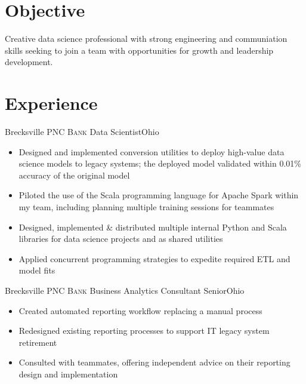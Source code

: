 \documentclass[letterpaper,12pt,color,final]{moderncv}
\begin{document}
\makecvtitle

\section{Objective}




Creative data science professional with strong engineering and communiation skills seeking to join a team with opportunities for growth and leadership development.

\section{Experience}

{Brecksville}
{\textsc{PNC Bank}}
{Data Scientist}{Ohio}
{\begin{itemize}
  \item Designed and implemented conversion utilities to deploy high-value data science models to legacy systems; the deployed model validated within 0.01\% accuracy of the original model
  \item Piloted the use of the Scala programming language for Apache Spark within my team, including planning multiple training sessions for teammates
  \item Designed, implemented \& distributed multiple internal Python and Scala libraries for data science projects and as shared utilities
  \item Applied concurrent programming strategies to expedite required ETL and model fits
 \end{itemize}}

{Brecksville}
{\textsc{PNC Bank}}
{Business Analytics Consultant Senior}{Ohio}
{\begin{itemize}
  \item Created automated reporting workflow replacing a manual process
  \item Redesigned existing reporting processes to support IT legacy system retirement
  \item Consulted with teammates, offering independent advice on their reporting design and implementation
 \end{itemize}}
\end{document}
